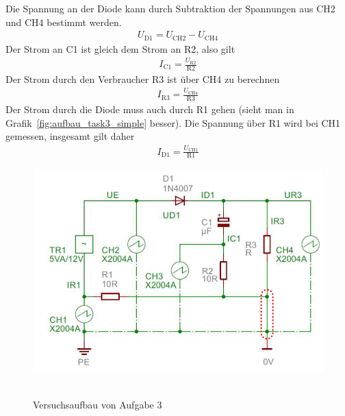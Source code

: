 \documentclass{article}
\begin{document}
Die Spannung an der Diode kann durch Subtraktion der Spannungen aus CH2 und CH4 bestimmt werden.
\begin{align}
U_{\text{D1}} = U_{\text{CH2}} - U_{\text{CH4}}
\end{align}
Der Strom an C1 ist gleich dem Strom an R2, also gilt
\begin{align}
I_{\text{C1}} = \frac{U_{\text{R2}}}{\text{R2}}
\end{align}
Der Strom durch den Verbraucher R3 ist über CH4 zu berechnen
\begin{align}
I_{\text{R3}} = \frac{U_{\text{CH4}}}{\text{R3}}
\end{align}
Der Strom durch die Diode muss auch durch R1 gehen (sieht man in Grafik~\ref{fig:aufbau_task3_simple} besser). Die Spannung über R1 wird bei CH1 gemessen, insgesamt gilt daher
\begin{align}
I_{\text{D1}} = \frac{U_{\text{CH1}}}{\text{R1}}
\end{align}

\begin{figure}[H]
\caption{Versuchsaufbau von Aufgabe 3}
\label{fig:aufbau_task3}
{\centering
\includegraphics[scale=1.7]{bilder/aufbau_task3.png}
~
}
\end{figure}
\end{document}

